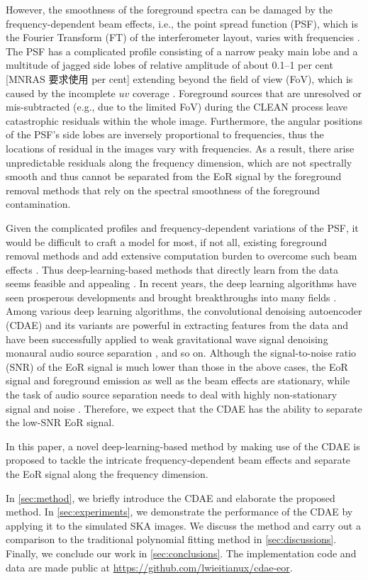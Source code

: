 \documentclass[letters,fleqn,usenatbib,onecolumn]{mnras}
\begin{document}
{\color{cyan}%
However, the smoothness of the foreground spectra can be damaged by
the frequency-dependent beam effects, i.e., the point spread function
(PSF), which is the Fourier Transform (FT) of the interferometer layout,
varies with frequencies \citep{liu2009ps}.
The PSF has a complicated profile consisting of a narrow peaky main lobe
and a multitude of jagged side lobes of relative amplitude of about
\numrange{0.1}{1} per cent [MNRAS 要求使用 per cent] extending beyond the field of view (FoV),
which is caused by the incomplete $uv$ coverage
\citep[e.g.,][figures 1 and 3]{liu2009ps}.
Foreground sources that are unresolved or mis-subtracted (e.g., due to
the limited FoV) during the CLEAN process leave catastrophic residuals
within the whole image.
Furthermore, the angular positions of the PSF's side lobes are inversely
proportional to frequencies,
thus the locations of residual in the images vary with frequencies.
As a result, there arise unpredictable residuals along the frequency
dimension, which are not spectrally smooth and thus cannot be separated
from the EoR signal by the foreground removal methods that rely on the
spectral smoothness of the foreground contamination.

Given the complicated profiles and frequency-dependent variations of
the PSF, it would be difficult to craft a model for most, if not all,
existing foreground removal methods and add extensive computation burden
to overcome such beam effects \citep[e.g.,][]{lochner2015,vafaeiSadr2018}.
Thus deep-learning-based methods that directly learn from the data
seems feasible and appealing \citep[e.g.,][]{herbel2018,vafaeiSadr2018}.
In recent years, the deep learning algorithms have seen prosperous
developments and brought breakthroughs into many fields
\citep[see][for a recent review]{lecun2015}.
Among various deep learning algorithms, the convolutional denoising
autoencoder (CDAE) and its variants are powerful in extracting features
from the data and have been successfully applied to
weak gravitational wave signal denoising \citep{shen2017}
monaural audio source separation \citep{grais2017}, and so on.
Although the signal-to-noise ratio (SNR) of the EoR signal is much
lower than those in the above cases, the EoR signal and foreground
emission as well as the beam effects are stationary, while the task of
audio source separation needs to deal with highly non-stationary signal
and noise \citep{grais2017}.
Therefore, we expect that the CDAE has the ability to separate the
low-SNR EoR signal.

In this paper, a novel deep-learning-based method by making use of the
CDAE is proposed to tackle the intricate frequency-dependent beam effects
and separate the EoR signal along the frequency dimension.} %
In \autoref{sec:method}, we briefly introduce the CDAE and elaborate
the proposed method.
In \autoref{sec:experiments}, we demonstrate the performance of the
CDAE by applying it to the simulated SKA images.
We discuss the method and carry out a comparison to the traditional
polynomial fitting method in \autoref{sec:discussions}.
Finally, we conclude our work in \autoref{sec:conclusions}.
The implementation code and data are made public at
\url{https://github.com/lwieitianux/cdae-eor}.
\end{document}
